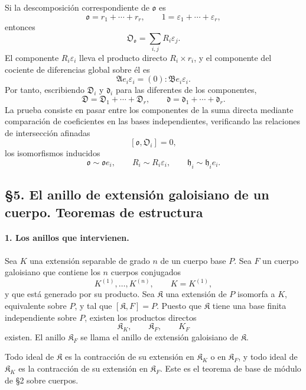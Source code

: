 \documentclass[11pt]{article}
\begin{document}
Si la descomposición correspondiente de $\mathfrak o$ es
\[
        \mathfrak o=r_1+
        \cdots+r_r,
        \qquad
        1=\varepsilon_1+
        \cdots+\varepsilon_r,
\]
entonces
\[
        \mathfrak O_{\mathfrak o}=\sum_{i,j}R_i\varepsilon_j.
\]
El componente $R_i\varepsilon_i$ lleva el producto directo $R_i\times r_i$, y el componente del cociente de diferencias global sobre él es
\[
        \mathfrak A e_i\varepsilon_i=(0):\mathfrak B e_i\varepsilon_i.
\]
Por tanto, escribiendo $\mathfrak D_i$ y $\mathfrak d_i$ para las diferentes de los componentes,
\[
        \mathfrak D=\mathfrak D_1+
        \cdots+\mathfrak D_r,
        \qquad
        \mathfrak d=\mathfrak d_1+
        \cdots+\mathfrak d_r.
\]
La prueba consiste en pasar entre los componentes de la suma directa mediante comparación de coeficientes en las bases independientes, verificando las relaciones de intersección afinadas
\[
        [\mathfrak o,\mathfrak O_i]=0,
\]
los isomorfismos inducidos
\[
        \mathfrak o\sim\mathfrak o e_i,
        \qquad
        R_i\sim R_i\varepsilon_i,
        \qquad
        \mathfrak h_i\sim \mathfrak h_i e_i.
\]

\subsection*{§5. El anillo de extensión galoisiano de un cuerpo. Teoremas de estructura}

\paragraph{1. Los anillos que intervienen.}
Sea $K$ una extensión separable de grado $n$ de un cuerpo base $P$. Sea $F$ un cuerpo galoisiano que contiene los $n$ cuerpos conjugados
\[
        K^{(1)},\ldots,K^{(n)},
        \qquad K=K^{(1)},
\]
y que está generado por su producto. Sea $\mathfrak K$ una extensión de $P$ isomorfa a $K$, equivalente sobre $P$, y tal que $[\mathfrak K,F]=P$. Puesto que $\mathfrak K$ tiene una base finita independiente sobre $P$, existen los productos directos
\[
        \mathfrak K_K,
        \qquad \mathfrak K_F,
        \qquad K_F
\]
existen. El anillo $\mathfrak K_F$ se llama el anillo de extensión galoisiano de $\mathfrak K$.

Todo ideal de $\mathfrak K$ es la contracción de su extensión en $\mathfrak K_K$ o en $\mathfrak K_F$, y todo ideal de $\mathfrak K_K$ es la contracción de su extensión en $\mathfrak K_F$. Este es el teorema de base de módulo de §2 sobre cuerpos.
\end{document}
